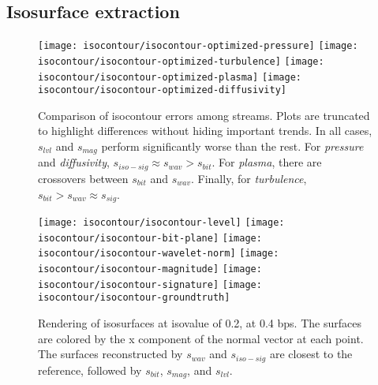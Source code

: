 \subsection{Isosurface extraction}\label{sec:isocontour}

\begin{figure*}[h]
	\centering
	{\texttt{[image: isocontour/isocontour-optimized-pressure]}}
	{\texttt{[image: isocontour/isocontour-optimized-turbulence]}}
	{\texttt{[image: isocontour/isocontour-optimized-plasma]}}
	{\texttt{[image: isocontour/isocontour-optimized-diffusivity]}}
	\caption{Comparison of isocontour errors among streams. Plots are truncated to highlight
	differences without hiding important trends. In all cases, $s_{lvl}$ and $s_{mag}$ perform
	significantly worse than the rest. For \emph{pressure} and \emph{diffusivity}, $s_{iso-sig}
	\approx s_{wav} > s_{bit}$. For \emph{plasma}, there are crossovers between $s_{bit}$ and
	$s_{wav}$. Finally, for \emph{turbulence}, $s_{bit} > s_{wav}\approx
	s_{sig}$.}\label{fig:isocontour-plots}
\vspace{1em}

	\centering
	{\texttt{[image: isocontour/isocontour-level]}}
	{\texttt{[image: isocontour/isocontour-bit-plane]}}
	{\texttt{[image: isocontour/isocontour-wavelet-norm]}}
	{\texttt{[image: isocontour/isocontour-magnitude]}}
	{\texttt{[image: isocontour/isocontour-signature]}}
	{\texttt{[image: isocontour/isocontour-groundtruth]}} \caption{Rendering of
	isosurfaces at isovalue of 0.2, at 0.4 bps. The surfaces are colored by the x component of the
	normal vector at each point. The surfaces reconstructed by $s_{wav}$ and $s_{iso-sig}$ are closest to the reference, followed by $s_{bit}$, $s_{mag}$, and $s_{lvl}$.}
	\label{fig:isocontour-surfaces-pressure}
\end{figure*}

